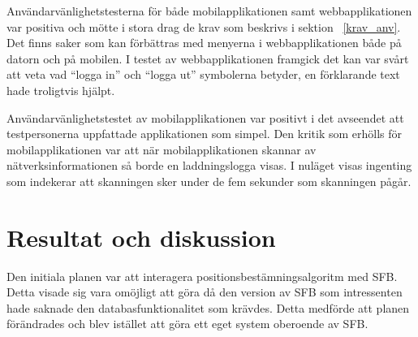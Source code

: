 \documentclass[a4paper,12pt]{article}
\begin{document}
 Användarvänlighetstesterna för både mobilapplikationen samt webbapplikationen var positiva och mötte i stora drag de krav som beskrivs i sektion ~\ref{krav_anv}. Det finns saker som kan förbättras med menyerna i webbapplikationen både på datorn och på mobilen. I testet av webbapplikationen framgick det kan var svårt att veta vad ``logga in'' och ``logga ut'' symbolerna betyder, en förklarande text hade troligtvis hjälpt.

 Användarvänlighetstestet av mobilapplikationen var positivt i det avseendet att testpersonerna uppfattade applikationen som simpel. Den kritik som erhölls för mobilapplikationen var att när mobilapplikationen skannar av nätverksinformationen så borde en laddningslogga visas. I nuläget visas ingenting som indekerar att skanningen sker under de fem sekunder som skanningen pågår.


 \section{Resultat och diskussion}\label{resultat}

 Den initiala planen var att interagera positionsbestämningsalgoritm med SFB. Detta visade sig vara omöjligt att göra då den version av SFB som intressenten hade saknade den databasfunktionalitet som krävdes. Detta medförde att planen förändrades och blev istället att göra ett eget system oberoende av SFB.
\end{document}

